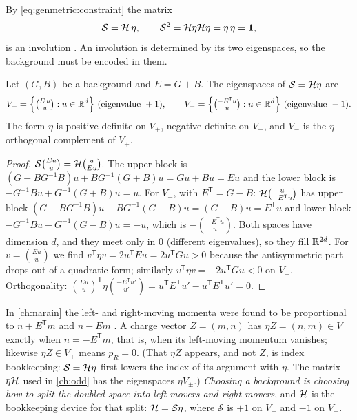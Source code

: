 By \eqref{eq:genmetric:constraint} the matrix
\begin{equation}\label{eq:genmetric:S}
 \mathcal S=\mathcal{H}\,\eta,\qquad \mathcal S^2=\mathcal{H}\eta\mathcal{H}\eta=\eta\,\eta=\mathbf 1,
\end{equation}
is an involution . An
involution is determined by its two eigenspaces, so the background must be encoded in them.

\begin{lemma}[Eigenspaces]\label{lem:genmetric:eigen}
Let $(G,B)$ be a background and $E=G+B$. The eigenspaces of $\mathcal S=\mathcal{H}\eta$ are
\begin{equation}\label{eq:genmetric:eigen}
 V_+=\Big\{\tbinom{E\,u}{u}:u\in\mathbb{R}^d\Big\}\ (\text{eigenvalue }+1),\qquad
 V_-=\Big\{\tbinom{-E^{\mathsf T}u}{u}:u\in\mathbb{R}^d\Big\}\ (\text{eigenvalue }-1).
\end{equation}
The form $\eta$ is positive definite on $V_+$, negative definite on $V_-$, and
$V_-$ is the $\eta$-orthogonal complement of $V_+$.
\end{lemma}
\begin{proof}
$\mathcal S\binom{Eu}{u}=\mathcal{H}\binom{u}{Eu}$. The upper block is
$(G-BG^{-1}B)u+BG^{-1}(G+B)u=Gu+Bu=Eu$ and the lower block is
$-G^{-1}Bu+G^{-1}(G+B)u=u$. For $V_-$, with $E^{\mathsf T}=G-B$:
$\mathcal{H}\binom{u}{-E^{\mathsf T}u}$ has upper block
$(G-BG^{-1}B)u-BG^{-1}(G-B)u=(G-B)u=E^{\mathsf T}u$ and lower block
$-G^{-1}Bu-G^{-1}(G-B)u=-u$, which is $-\binom{-E^{\mathsf T}u}{u}$. Both spaces have
dimension $d$, and they meet only in $0$ (different eigenvalues), so they fill
$\mathbb{R}^{2d}$. For $v=\binom{Eu}{u}$ we find $v^{\mathsf T}\eta v=2u^{\mathsf T}Eu=2u^{\mathsf T}Gu>0$
because the antisymmetric part drops out of a quadratic form; similarly
$v^{\mathsf T}\eta v=-2u^{\mathsf T}Gu<0$ on $V_-$. Orthogonality:
$\binom{Eu}{u}^{\mathsf T}\eta\binom{-E^{\mathsf T}u'}{u'}=u^{\mathsf T}E^{\mathsf T}u'
-u^{\mathsf T}E^{\mathsf T}u'=0$.
\end{proof}
\noindent In \cref{ch:narain} the left- and right-moving momenta were found to be
proportional to $n+E^{\mathsf T}m$ and $n-Em$ . A charge vector $Z=(m,n)$ has $\eta Z=(n,m)\in V_-$ exactly when
$n=-E^{\mathsf T}m$, that is, when its left-moving momentum vanishes; likewise
$\eta Z\in V_+$ means $p_R=0$. (That $\eta Z$ appears, and not $Z$, is index bookkeeping: $\mathcal S=\mathcal{H}\eta$ first
lowers the index of its argument with $\eta$. The matrix $\eta\mathcal{H}$ used in \cref{ch:odd}
has the eigenspaces $\eta V_\pm$.) \emph{Choosing a background is choosing how to split the
doubled space into left-movers and right-movers}, and $\mathcal{H}$ is the bookkeeping device for
that split: $\mathcal{H}=\mathcal S\eta$, where $\mathcal S$ is $+1$ on $V_+$ and $-1$ on $V_-$.


